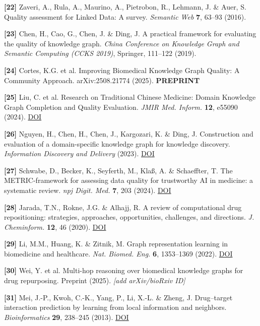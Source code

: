 \textbf{{[}22{]}} Zaveri, A., Rula, A., Maurino, A., Pietrobon, R., Lehmann, J. \& Auer, S. Quality assessment for Linked Data: A survey. \emph{Semantic Web} \textbf{7}, 63--93 (2016).

\textbf{{[}23{]}} Chen, H., Cao, G., Chen, J. \& Ding, J. A practical framework for evaluating the quality of knowledge graph. \emph{China Conference on Knowledge Graph and Semantic Computing (CCKS 2019)}, Springer, 111--122 (2019).

\textbf{{[}24{]}} Cortes, K.G. et al. Improving Biomedical Knowledge Graph Quality: A Community Approach. arXiv:2508.21774 (2025). \textbf{PREPRINT}

\textbf{{[}25{]}} Liu, C. et al. Research on Traditional Chinese Medicine: Domain Knowledge Graph Completion and Quality Evaluation. \emph{JMIR Med. Inform.} \textbf{12}, e55090 (2024). \href{https://doi.org/10.2196/55090}{DOI}

\textbf{{[}26{]}} Nguyen, H., Chen, H., Chen, J., Kargozari, K. \& Ding, J. Construction and evaluation of a domain-specific knowledge graph for knowledge discovery. \emph{Information Discovery and Delivery} (2023). \href{https://doi.org/10.1108/IDD-06-2022-0054}{DOI}

\textbf{{[}27{]}} Schwabe, D., Becker, K., Seyferth, M., Klaß, A. \& Schaeffter, T. The METRIC-framework for assessing data quality for trustworthy AI in medicine: a systematic review. \emph{npj Digit. Med.} \textbf{7}, 203 (2024). \href{https://doi.org/10.1038/s41746-024-01196-4}{DOI}

\textbf{{[}28{]}} Jarada, T.N., Rokne, J.G. \& Alhajj, R. A review of computational drug repositioning: strategies, approaches, opportunities, challenges, and directions. \emph{J. Cheminform.} \textbf{12}, 46 (2020). \href{https://doi.org/10.1186/s13321-020-00450-7}{DOI}

\textbf{{[}29{]}} Li, M.M., Huang, K. \& Zitnik, M. Graph representation learning in biomedicine and healthcare. \emph{Nat. Biomed. Eng.} \textbf{6}, 1353--1369 (2022). \href{https://doi.org/10.1038/s41551-022-00942-x}{DOI}

\textbf{{[}30{]}} Wei, Y. et al. Multi-hop reasoning over biomedical knowledge graphs for drug repurposing. Preprint (2025). \emph{{[}add arXiv/bioRxiv ID{]}}

\textbf{{[}31{]}} Mei, J.-P., Kwoh, C.-K., Yang, P., Li, X.-L. \& Zheng, J. Drug--target interaction prediction by learning from local information and neighbors. \emph{Bioinformatics} \textbf{29}, 238--245 (2013). \href{https://doi.org/10.1093/bioinformatics/bts670}{DOI}

